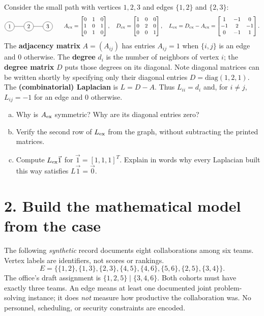 \documentclass[10pt,letterpaper]{article}
\begin{document}
Consider the small path with vertices $1,2,3$ and edges $\{1,2\}$ and $\{2,3\}$:
\[
\begin{tikzpicture}[baseline=-0.5ex,every node/.style={circle,draw,minimum size=6mm,inner sep=0pt}]
\node (a) at (0,0) {1}; \node (b) at (1.2,0) {2}; \node (c) at (2.4,0) {3};
\draw (a)--(b)--(c);
\end{tikzpicture}
\qquad
A_{\rm ex}=\begin{bmatrix}0&1&0\\1&0&1\\0&1&0\end{bmatrix},\quad
D_{\rm ex}=\begin{bmatrix}1&0&0\\0&2&0\\0&0&1\end{bmatrix},\quad
L_{\rm ex}=D_{\rm ex}-A_{\rm ex}=
\begin{bmatrix}1&-1&0\\-1&2&-1\\0&-1&1\end{bmatrix}.
\]
The \textbf{adjacency matrix} $A=(A_{ij})$ has entries $A_{ij}=1$ when $\{i,j\}$ is an edge and $0$ otherwise. The \textbf{degree} $d_i$ is the number of neighbors of vertex $i$; the \textbf{degree matrix} $D$ puts those degrees on its diagonal. Note diagonal matrices can be written shortly by specifying only their diagonal entries $D=\text{diag}(1,2,1)$. The \textbf{(combinatorial) Laplacian} is $L=D-A$. Thus $L_{ii}=d_i$ and, for $i\ne j$, $L_{ij}=-1$ for an edge and $0$ otherwise.

\begin{enumerate}[a.,leftmargin=*]
\item Why is $A_{\rm ex}$ symmetric? Why are its diagonal entries zero?\\[0.34in]
\item Verify the second row of $L_{\rm ex}$ from the graph, without subtracting the printed matrices.\\[0.38in]
\item Compute $L_{\rm ex}\vec{1}$ for $\vec{1}=[1,1,1]^T$. Explain in words why every Laplacian built this way satisfies $L\vec{1}=\vec{0}$.\\[0.43in]
\end{enumerate}

\newpage
\section*{2. Build the mathematical model from the case}
The following \emph{synthetic} record documents eight collaborations among six teams. Vertex labels are identifiers, not scores or rankings.
\[
E=\bigl\{\{1,2\},\{1,3\},\{2,3\},\{4,5\},\{4,6\},\{5,6\},\{2,5\},\{3,4\}\bigr\}.
\]
The office's draft assignment is $\{1,2,5\}\mid\{3,4,6\}$. Both cohorts must have exactly three teams. An edge means at least one documented joint problem-solving instance; it does \emph{not} measure how productive the collaboration was. No personnel, scheduling, or security constraints are encoded.
\end{document}
